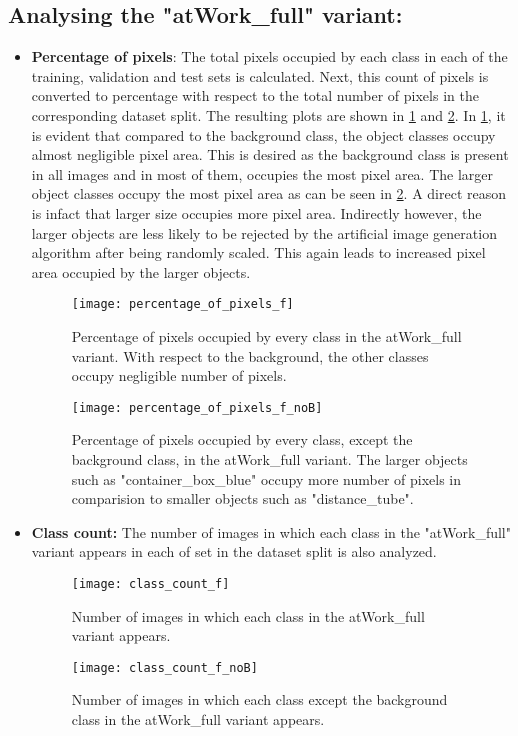 \documentclass[paper=a4,11pt,parskip=half,toc=listof]{scrartcl}
\begin{document}
	\subsection{Analysing the "atWork\_full" variant:}
		\begin{itemize}
			\item \textbf{Percentage of pixels}: The total pixels occupied by each class in each of the training, validation and test sets is calculated. Next, this count of pixels is converted to percentage with respect to the total number of pixels in the corresponding dataset split. The resulting plots are shown in \ref{Fig:10} and \ref{Fig:11}. In \ref{Fig:10}, it is evident that compared to the background class, the object classes occupy almost negligible pixel area. This is desired as the background class is present in all images and in most of them, occupies the most pixel area. The larger object classes occupy the most pixel area as can be seen in \ref{Fig:11}. A direct reason is infact that larger size occupies more pixel area. Indirectly however, the larger objects are less likely to be rejected by the artificial image generation algorithm after being randomly scaled. This again leads to increased pixel area occupied by the larger objects.
			
			\begin{figure}[!htb]
				\centering
				\texttt{[image: percentage\_of\_pixels\_f]}
				\caption{Percentage of pixels occupied by every class in the atWork\_full variant. With respect to the background, the other classes occupy negligible number of pixels.}
				\label{Fig:10}
			\end{figure}
			
			\begin{figure}[!htb]
			\centering
				\texttt{[image: percentage\_of\_pixels\_f\_noB]}
				\caption{Percentage of pixels occupied by every class, except the background class, in the atWork\_full variant. The larger objects such as "container\_box\_blue" occupy more number of pixels in comparision to smaller objects such as "distance\_tube".}
				\label{Fig:11}
			\end{figure}
			
			\item \textbf{Class count:} The number of images in which each class in the "atWork\_full" variant appears in each of set in the dataset split is also analyzed. 
			
			\begin{figure}[!htb]
			\centering
				\texttt{[image: class\_count\_f]}
				\caption{Number of images in which each class in the atWork\_full variant appears.}
				\label{Fig:12}
			\end{figure}
			
			\begin{figure}[!htb]
			\centering
				\texttt{[image: class\_count\_f\_noB]}
				\caption{Number of images in which each class except the background class in the atWork\_full variant appears.}
				\label{Fig:13}
			\end{figure}
		\end{itemize}
		
\end{document}
